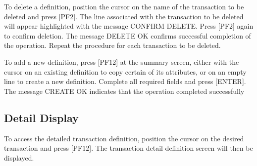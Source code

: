 \documentclass[letterpaper,10pt,english]{sphinxmanual}
\begin{document}
\sphinxAtStartPar
{} \sphinxhyphen{} To delete a definition, position the cursor on the name of the transaction to be deleted and press {[}PF2{]}. The line associated with the transaction to be deleted will appear highlighted with the message CONFIRM DELETE. Press {[}PF2{]} again to confirm deletion. The message DELETE OK confirms successful completion of the operation. Repeat the procedure for each transaction to be deleted.

\sphinxAtStartPar
{} \sphinxhyphen{} To add a new definition, press {[}PF12{]} at the summary screen, either with the cursor on an existing definition to copy certain of its attributes, or on an empty line to create a new definition. Complete all required fields and press {[}ENTER{]}. The message CREATE OK indicates that the operation completed successfully

\ignorespaces 

\subsection{Detail Display}
\label{\detokenize{connectivity_guide:index-114}}\label{\detokenize{connectivity_guide:id64}}
\sphinxAtStartPar
To access the detailed transaction definition, position the cursor on the desired transaction and press {[}PF12{]}. The transaction detail definition screen will then be displayed.

\sphinxAtStartPar
{}

\sphinxAtStartPar
{}

\ignorespaces 
\end{document}

